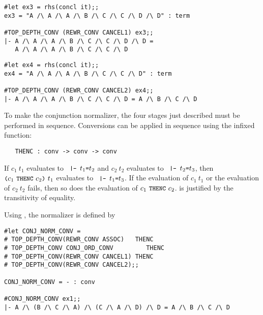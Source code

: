 \begin{session}\begin{verbatim}
#let ex3 = rhs(concl it);;
ex3 = "A /\ A /\ A /\ B /\ C /\ C /\ D /\ D" : term

#TOP_DEPTH_CONV (REWR_CONV CANCEL1) ex3;;
|- A /\ A /\ A /\ B /\ C /\ C /\ D /\ D =
   A /\ A /\ A /\ B /\ C /\ C /\ D
\end{verbatim}\end{session}

\begin{session}\begin{verbatim}
#let ex4 = rhs(concl it);;
ex4 = "A /\ A /\ A /\ B /\ C /\ C /\ D" : term

#TOP_DEPTH_CONV (REWR_CONV CANCEL2) ex4;;
|- A /\ A /\ A /\ B /\ C /\ C /\ D = A /\ B /\ C /\ D
\end{verbatim}\end{session}


To make the conjunction normalizer, the four stages just described
must be performed in sequence. Conversions can be applied in sequence using
the infixed function:

\begin{hol}\begin{verbatim}
   THENC : conv -> conv -> conv
\end{verbatim}\end{hol}


\noindent If $c_1\ t_1$ evaluates to $\ml{ |- }t_1\ml{=}t_2$ and
$c_2\ t_2$ evaluates to $\ml{ |- }t_2\ml{=}t_3$, then
$\ml{(}c_1\ \ml{THENC}\ c_2\ml{)}\ t_1$ evaluates to
$\ml{\ |-\ }t_1\ml{=}t_3$. If the
evaluation of $c_1\ t_1$ or the evaluation of $c_2\ t_2$ fails,
then so does the evaluation of $c_1\ \ml{THENC}\ c_2$.  is
justified by the transitivity of equality.

Using , the normalizer is defined by

\begin{session}\begin{verbatim}
#let CONJ_NORM_CONV =
# TOP_DEPTH_CONV(REWR_CONV ASSOC)   THENC
# TOP_DEPTH_CONV CONJ_ORD_CONV         THENC
# TOP_DEPTH_CONV(REWR_CONV CANCEL1) THENC
# TOP_DEPTH_CONV(REWR_CONV CANCEL2);;

CONJ_NORM_CONV = - : conv

#CONJ_NORM_CONV ex1;;
|- A /\ (B /\ C /\ A) /\ (C /\ A /\ D) /\ D = A /\ B /\ C /\ D
\end{verbatim}\end{session}

